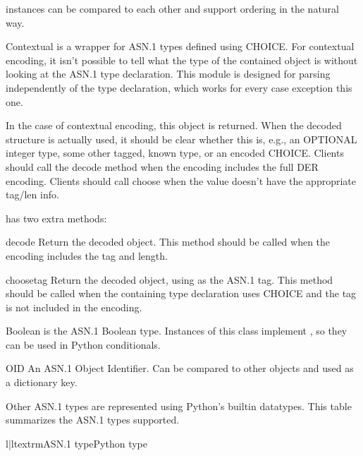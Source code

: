 \documentclass{howto}
\begin{document}
 instances can be compared to each other and support
ordering in the natural way.

\begin{classdesc}{Contextual}{}
 is a wrapper for ASN.1 types defined using CHOICE.
For contextual encoding, it isn't possible to tell what the type of
the contained object is without looking at the ASN.1 type declaration.
This module is designed for parsing independently of the type
declaration, which works for every case exception this one.

In the case of contextual encoding, this object is returned.  When the
decoded structure is actually used, it should be clear whether this
is, e.g., an OPTIONAL integer type, some other tagged, known type, or
an encoded CHOICE.  Clients should call the decode method when the
encoding includes the full DER encoding.  Clients should call choose
when the value doesn't have the appropriate tag/len info.

 has two extra methods:

\begin{methoddesc}{decode}{}
Return the decoded object.  This method should be called when the
encoding includes the tag and length.
\end{methoddesc}

\begin{methoddesc}{choose}{tag}
Return the decoded object, using  as the ASN.1 tag.  This
method should be called when the containing type declaration uses
CHOICE and the tag is not included in the encoding.
\end{methoddesc}

\end{classdesc}

\begin{classdesc}{Boolean}{}
 is the ASN.1 Boolean type.  Instances of this class
implement , so they can be used in Python
conditionals. 
\end{classdesc}

\begin{classdesc}{OID}{}
An ASN.1 Object Identifier.  Can be compared to other 
objects and used as a dictionary key.
\end{classdesc}

Other ASN.1 types are represented using Python's builtin datatypes.
This table summarizes the ASN.1 types supported.

\begin{tableii}{l|l}{textrm}{ASN.1 type}{Python type}
\end{tableii}
\end{document}
